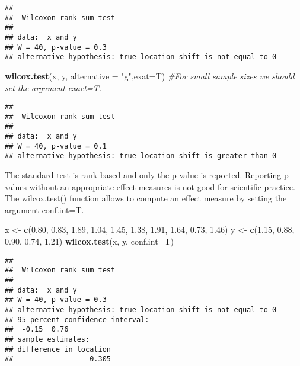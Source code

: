\documentclass[]{book}
\newenvironment{Shaded}{\begin{snugshade}}{\end{snugshade}}
\newcommand{\KeywordTok}[1]{\textcolor[rgb]{0.13,0.29,0.53}{\textbf{#1}}}
\newcommand{\DataTypeTok}[1]{\textcolor[rgb]{0.13,0.29,0.53}{#1}}
\newcommand{\FloatTok}[1]{\textcolor[rgb]{0.00,0.00,0.81}{#1}}
\newcommand{\StringTok}[1]{\textcolor[rgb]{0.31,0.60,0.02}{#1}}
\newcommand{\CommentTok}[1]{\textcolor[rgb]{0.56,0.35,0.01}{\textit{#1}}}
\newcommand{\NormalTok}[1]{#1}
\theoremstyle{definition}
\theoremstyle{definition}
\theoremstyle{definition}
\theoremstyle{remark}
\begin{document}
\begin{verbatim}
## 
##  Wilcoxon rank sum test
## 
## data:  x and y
## W = 40, p-value = 0.3
## alternative hypothesis: true location shift is not equal to 0
\end{verbatim}

\begin{Shaded}
\begin{Highlighting}[]
\KeywordTok{wilcox.test}\NormalTok{(x, y, }\DataTypeTok{alternative =} \StringTok{"g"}\NormalTok{,}\DataTypeTok{exat=}\NormalTok{T) }\CommentTok{#For small sample sizes we should  set the argument exact=T.}
\end{Highlighting}
\end{Shaded}

\begin{verbatim}
## 
##  Wilcoxon rank sum test
## 
## data:  x and y
## W = 40, p-value = 0.1
## alternative hypothesis: true location shift is greater than 0
\end{verbatim}

The standard test is rank-based and only the p-value is reported.
Reporting p-values without an appropriate effect measures is not good
for scientific practice. The wilcox.test() function allows to compute an
effect measure by setting the argument conf.int=T.

\begin{Shaded}
\begin{Highlighting}[]
\NormalTok{x <-}\StringTok{ }\KeywordTok{c}\NormalTok{(}\FloatTok{0.80}\NormalTok{, }\FloatTok{0.83}\NormalTok{, }\FloatTok{1.89}\NormalTok{, }\FloatTok{1.04}\NormalTok{, }\FloatTok{1.45}\NormalTok{, }\FloatTok{1.38}\NormalTok{, }\FloatTok{1.91}\NormalTok{, }\FloatTok{1.64}\NormalTok{, }\FloatTok{0.73}\NormalTok{, }\FloatTok{1.46}\NormalTok{)}
\NormalTok{y <-}\StringTok{ }\KeywordTok{c}\NormalTok{(}\FloatTok{1.15}\NormalTok{, }\FloatTok{0.88}\NormalTok{, }\FloatTok{0.90}\NormalTok{, }\FloatTok{0.74}\NormalTok{, }\FloatTok{1.21}\NormalTok{)}
\KeywordTok{wilcox.test}\NormalTok{(x, y, }\DataTypeTok{conf.int=}\NormalTok{T) }
\end{Highlighting}
\end{Shaded}

\begin{verbatim}
## 
##  Wilcoxon rank sum test
## 
## data:  x and y
## W = 40, p-value = 0.3
## alternative hypothesis: true location shift is not equal to 0
## 95 percent confidence interval:
##  -0.15  0.76
## sample estimates:
## difference in location 
##                  0.305
\end{verbatim}
\end{document}

